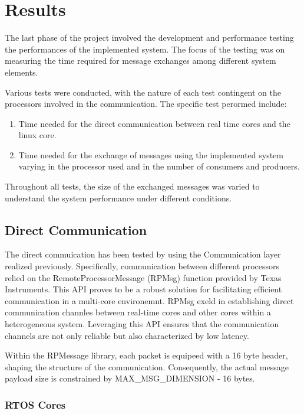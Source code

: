 \section{Results}

The last phase of the project involved the development and performance testing
the performances of the implemented system.
The focus of the testing was on measuring the time required for message
exchanges among different system elements.

Various tests were conducted, with the nature of each test contingent on the
processors involved in the communication.
The specific test perormed include:

\begin{enumerate}
    \item   Time needed for the direct communication between real time cores
            and the linux core.
    \item   Time needed for the exchange of messages using the implemented
            system varying in the processor used and in the number of
            consumers and producers.
\end{enumerate}

Throughout all tests, the size of the exchanged messages was varied to
understand the system performance under different conditions.

\subsection{Direct Communication}

The direct commuication has been tested by using the Communication layer
realized previously.
Specifically, communication between different processors relied on the
RemoteProcessorMessage (RPMsg) function provided by Texas Instruments.
This API proves to be a robust solution for facilitating efficient
communication in a multi-core environemnt. RPMsg exeld in establishing direct
communication channles between real-time cores and other cores within a
heterogeneous system. Leveraging this API ensures that the communication
channels are not only reliable but also characterized by low latency.

Within the RPMessage library, each packet is equipeed with a 16 byte header,
shaping the structure of the communication. Consequently, the actual message
payload size is constrained by MAX\_MSG\_DIMENSION - 16 bytes.

\subsubsection{RTOS Cores}

